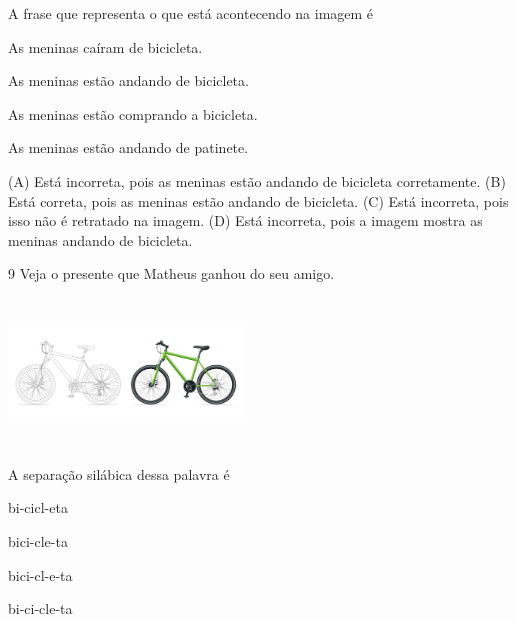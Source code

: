 
A frase que representa o que está acontecendo na imagem é

\begin{escolha}
\item As meninas caíram de bicicleta.

\item As meninas estão andando de bicicleta.

\item As meninas estão comprando a bicicleta.

\item As meninas estão andando de patinete.
\end{escolha}


(A) Está incorreta, pois as meninas estão andando de bicicleta corretamente.
(B) Está correta, pois as meninas estão andando de bicicleta.
(C) Está incorreta, pois isso não é retratado na imagem.
(D) Está incorreta, pois a imagem mostra as meninas andando de bicicleta.

\num{9} Veja o presente que Matheus ganhou do seu amigo.

\includegraphics[width=2.46250in,height=1.54444in]{media/image180.jpeg}


A separação silábica dessa palavra é

\begin{minipage}{.5\textwidth}
\begin{escolha}
\item bi-cicl-eta

\item bici-cle-ta

\item bici-cl-e-ta

\item bi-ci-cle-ta
\end{escolha}
\end{minipage}

